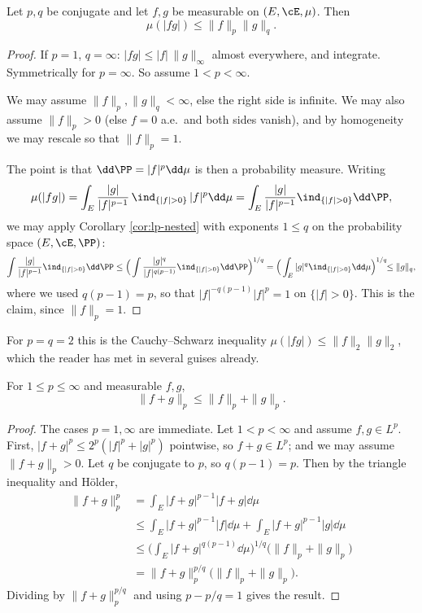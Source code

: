 \begin{theorem}\label{pm-thm:holder}
	Let $p,q$ be conjugate and let $f,g$ be measurable on $(E,\cE,\mu)$. Then
	$$
	\mu(|fg|) \leq \|f\|_p\|g\|_q.
	$$
\end{theorem}
\begin{proof}
	If $p=1$, $q=\infty$: $|fg|\leq |f|\,\|g\|_\infty$ almost everywhere, and integrate. Symmetrically for $p = \infty$. So assume $1<p<\infty$.

	We may assume $\|f\|_p, \|g\|_q < \infty$, else the right side is infinite. We may also assume $\|f\|_p > 0$ (else $f = 0$ a.e.\ and both sides vanish), and by homogeneity we may rescale so that $\|f\|_p = 1$.

	The point is that $\dd\PP = |f|^p\dd\mu$ is then a probability measure. Writing
	$$
	\mu(|fg|) = \int_E \frac{|g|}{|f|^{p-1}}\,\ind_{\{|f|>0\}}\,|f|^p\dd\mu = \int_E \frac{|g|}{|f|^{p-1}}\ind_{\{|f|>0\}}\dd\PP,
	$$
	we may apply Corollary \ref{cor:lp-nested} with exponents $1 \leq q$ on the probability space $(E,\cE,\PP)$:
	$$
	\int \frac{|g|}{|f|^{p-1}}\ind_{\{|f|>0\}}\dd\PP \leq \Big( \int \frac{|g|^q}{|f|^{q(p-1)}}\ind_{\{|f|>0\}}\dd\PP\Big)^{1/q} = \Big( \int_E |g|^q \ind_{\{|f|>0\}}\dd\mu\Big)^{1/q}\!\! \leq \|g\|_q,
	$$
	where we used $q(p-1) = p$, so that $|f|^{-q(p-1)}|f|^p = 1$ on $\{|f|>0\}$. This is the claim, since $\|f\|_p=1$.
\end{proof}

\begin{remark}
	For $p = q = 2$ this is the Cauchy--Schwarz inequality $\mu(|fg|) \leq \|f\|_2\|g\|_2$, which the reader has met in several guises already.
\end{remark}

\begin{theorem}\label{pm-thm:minkowski}
	For $1\leq p\leq\infty$ and measurable $f,g$,
	$$
	\|f+g\|_p \leq \|f\|_p+\|g\|_p.
	$$
\end{theorem}
\begin{proof}
	The cases $p=1,\infty$ are immediate. Let $1<p<\infty$ and assume $f,g \in L^p$. First, $|f+g|^p \leq 2^p(|f|^p+|g|^p)$ pointwise, so $f + g \in L^p$; and we may assume $\|f+g\|_p>0$. Let $q$ be conjugate to $p$, so $q(p-1)=p$. Then by the triangle inequality and H\"older,
	\begin{align*}
		\|f+g\|_p^p &= \int_E |f+g|^{p-1}|f+g|\dd\mu \\
		&\leq \int_E |f+g|^{p-1}|f|\dd\mu + \int_E |f+g|^{p-1}|g|\dd\mu\\
		&\leq \Big(\int_E |f+g|^{q(p-1)}\dd\mu\Big)^{1/q}\big(\|f\|_p+\|g\|_p\big)\\
		&= \|f+g\|_p^{p/q}\big(\|f\|_p+\|g\|_p\big).
	\end{align*}
	Dividing by $\|f+g\|_p^{p/q}$ and using $p - p/q = 1$ gives the result.
\end{proof}

